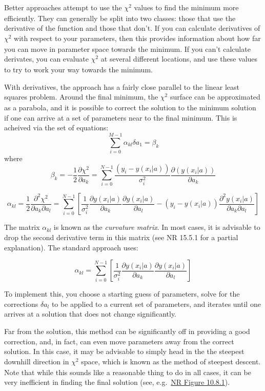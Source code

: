 \documentclass[12pt]{article}
\begin{document}
Better approaches attempt to use the $ \chi^{2}_{}$ values to find the
minimum more efficiently. They can generally be split into two classes:
those that use the derivative of the function and those that don't. If you
can calculate derivatives of $ \chi^{2}_{}$ with respect to your
parameters, then this provides information about how far you can move in
parameter space towards the minimum. If you can't calculate derivates, you
can evaluate $ \chi^{2}_{}$ at several different locations, and use these
values to try to work your way towards the minimum.

With derivatives, the approach has a fairly close parallel to the linear
least squares problem. Around the final minimum, the $ \chi^{2}_{}$ surface
can be approximated as a parabola, and it is possible to correct the
solution to the minimum solution if one can arrive at a set of parameters
near to the final minimum. This is acheived via the set of equations:
$$ \sum_{i=0}^{M-1}\alpha_{kl}\delta a_{1} = \beta_{k} $$
where
$$ \beta_{k} = -\frac{1}{2}\frac{\partial\chi^{2}}{\partial a_{k}} =
\sum_{i=0}^{N-1}\frac{(y_{i}-y(x_{i}|a))}{\sigma_{i}^{2}}
\frac{\partial(y(x_{i}|a))}{\partial a_{k}} $$

$$ \alpha_{kl} = \frac{1}{2}\frac{\partial^2\chi^2}{\partial a_k\partial a_l} =
\sum_{i=0}^{N-1}\left[\frac{1}{\sigma_i^2}\frac{\partial y(x_i|a)}{\partial a_k}
    \frac{\partial y(x_i|a)}{\partial a_l} -
    (y_i-y(x_i|a))\frac{\partial^2y(x_i|a)}{\partial{a_k}\partial{a_l}} \right] $$

The matrix $\alpha_{kl}$ is known as the \emph{curvature matrix}. In most
cases, it is advisable to drop the second derivative term in this matrix
(see NR 15.5.1 for a partial explanation). The standard approach uses:

$$ \alpha_{kl} = \sum_{i=0}^{N-1}\left[\frac{1}{\sigma_i^2}
\frac{\partial{y}(x_i|a)}{\partial{a_k}}
\frac{\partial{y}(x_i|a)}{\partial{a_l}} \right] $$

To implement this, you choose a starting guess of parameters, solve
for the corrections  $\delta a_l$ to be applied to a current set of
parameters, and iterates until one arrives at a solution that does not
change significantly.

Far from the solution, this method can be significantly off in
providing a good correction, and, in fact, can even move parameters
away from the correct solution. In this case, it may be advisable to
simply head in the the steepest downhill direction in $ \chi^{2}_{}$
space, which is known as the method of steepest descent. Note that
while this sounds like a reasonable thing to do in all cases, it can
be very inefficient in finding the final solution
(see, e.g.\ \href{http://astronomy.nmsu.edu/holtz/a575/images/NR10.8.1.png}
{NR Figure 10.8.1}).
\end{document}
